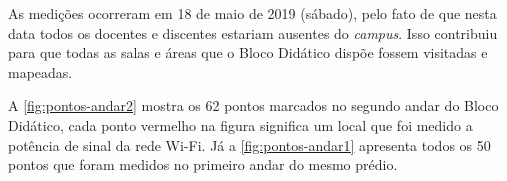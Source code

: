 As medições ocorreram em 18 de maio de 2019 (sábado), pelo fato de que nesta data todos os docentes e discentes estariam ausentes do \textit{campus}. Isso contribuiu para que todas as salas e áreas que o Bloco Didático dispõe fossem visitadas e mapeadas.

A \autoref{fig:pontos-andar2} mostra os 62 pontos marcados no segundo andar do Bloco Didático, cada ponto vermelho na figura significa um local que foi medido a potência de sinal da rede Wi-Fi. Já a \autoref{fig:pontos-andar1} apresenta todos os 50 pontos que foram medidos no primeiro andar do mesmo prédio.

\begin{figure}[H]
	\centering
\end{figure}

\begin{figure}[H]
	\centering
\end{figure}

